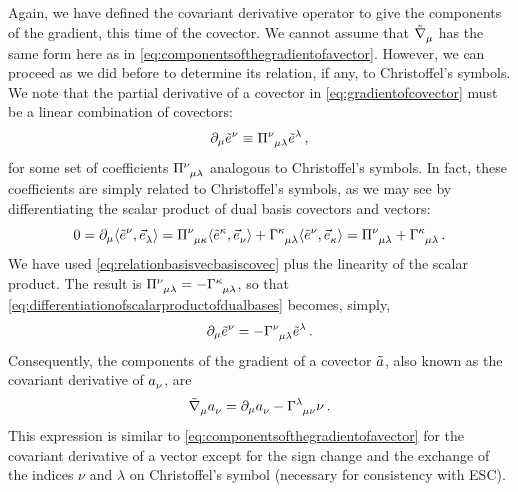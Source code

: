  Again, we have defined the covariant derivative operator to give the components of the gradient, this time of the covector. We cannot assume that $\tgradcov\mu$ has the same form here as in \cref{eq:componentsofthegradientofavector}. However, we can proceed as we did before to determine its relation, if any, to Christoffel's symbols. We note that the partial derivative of a covector in \cref{eq:gradientofcovector} must be a linear combination of covectors:
%
\begin{equation}\label{eq:gradientofbasiscovectors}
  \ipd\mu\tbcov\nu \defas \tensor{\Pi}{^\nu_\mu_\lambda}\tbcov\lambda\,,
\end{equation}
%
for some set of coefficients $\tensor{\Pi}{^\nu_\mu_\lambda}$ analogous to Christoffel's symbols. In fact, these coefficients are simply related to Christoffel's symbols, as we may see by differentiating the scalar product of dual basis covectors and vectors:
%
\begin{equation}\label{eq:differentiationofscalarproductofdualbases}
  0 = \ipd\mu\sprod{\tbcov\nu}{\tbvec\lambda}
    = \tensor{\Pi}{^\nu_\mu_\kappa}\sprod{\tbcov\kappa}{\tbvec\nu} 
      + \tchris\kappa\mu\lambda\sprod{\tbcov\nu}{\tbvec\kappa}
    = \tensor{\Pi}{^\nu_\mu_\lambda} + \tchris\kappa\mu\lambda\,.
\end{equation}
%
We have used \cref{eq:relationbasisvecbasiscovec} plus the linearity of the scalar product. The result is $\tensor{\Pi}{^\nu_\mu_\lambda} = - \tchris\kappa\mu\lambda$, so that \cref{eq:differentiationofscalarproductofdualbases} becomes, simply,
%
\begin{equation}
  \ipd\mu\tbcov\nu = -\tchris\nu\mu\lambda\tbcov\lambda\,.
\end{equation}
%
Consequently, the components of the gradient of a covector $\tilde{a}$, also known as the covariant derivative of $\tcov a\nu$, are
%
\begin{equation}\label{eq:gradientofcomponentsofcovector}
  \tgradcov\mu\tcov a\nu = \ipd\mu\tcov a\nu - \tchris\lambda\mu\nu\tcov\nu\,.
\end{equation}
%
 This expression is similar to \cref{eq:componentsofthegradientofavector} for the covariant derivative of a vector except for the sign change and the exchange of the indices $\nu$ and $\lambda$ on Christoffel's symbol (necessary for consistency with ESC).

